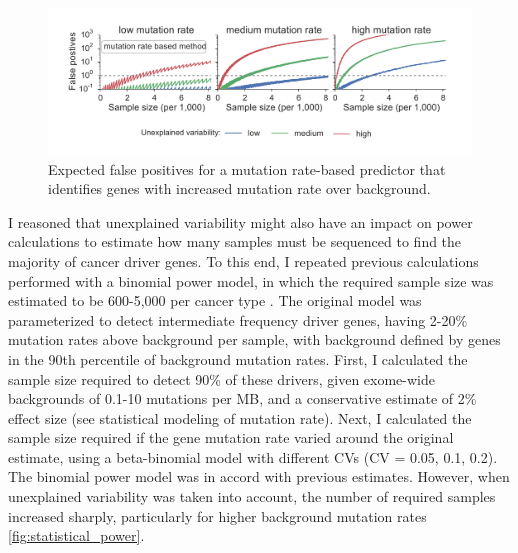 \begin{figure}
  \centering
  \makeatletter
  \let\@currsize\normalsize
  \includegraphics[width=0.9\linewidth]{figures/chapter2/expected_false_positives_mutation_rate.pdf}
  \caption[]{Expected false positives for a mutation rate-based predictor that identifies genes with increased mutation rate over background.}
  \label{fig:expected_fp}
\end{figure}

I reasoned that unexplained variability might also have an impact on power calculations to estimate how many samples must be sequenced to find the majority of cancer driver genes. To this end, I repeated previous calculations performed with a binomial power model, in which the required sample size was estimated to be 600-5,000 per cancer type \cite{RN14}. The original model was parameterized to detect intermediate frequency driver genes, having 2-20\% mutation rates above background per sample, with background defined by genes in the 90th percentile of background mutation rates. First, I calculated the sample size required to detect 90\% of these drivers, given exome-wide backgrounds of 0.1-10 mutations per MB, and a conservative estimate of 2\% effect size (see statistical modeling of mutation rate). Next, I calculated the sample size required if the gene mutation rate varied around the original estimate, using a beta-binomial model with different CVs (CV = 0.05, 0.1, 0.2). The binomial power model was in accord with previous estimates. However, when unexplained variability was taken into account, the number of required samples increased sharply, particularly for higher background mutation rates \ref{fig:statistical_power}.

